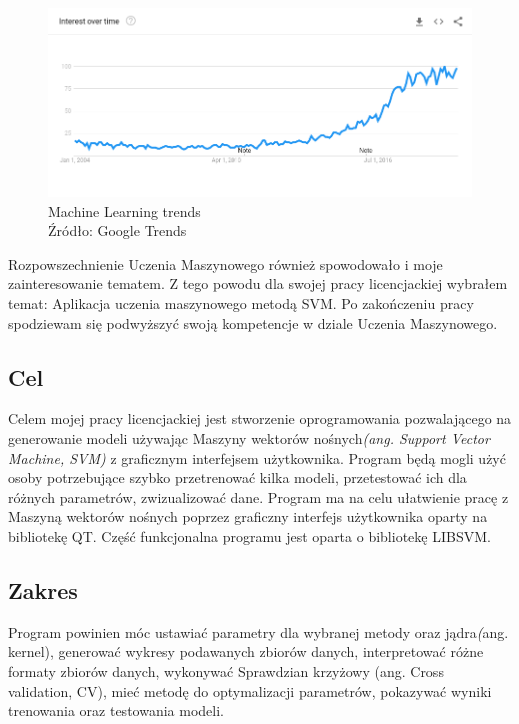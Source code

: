 \documentclass[paper=a4, fontsize=11pt]{scrartcl} %
\numberwithin{equation}{section} %
\numberwithin{figure}{section} %
\newcommand*{\captionsource}[2]{%
  \caption[{#1}]{%
    #1%
    \\\hspace{\linewidth}%
    Źródło: #2%
  }%
}
\begin{document}
\begin{figure}[h]
    \begin{center}
        \includegraphics[scale=0.5]{./img/google-trends-ml.png}
        \captionsource{Machine Learning trends}{Google Trends}
        \label{fig:google-trends-ml}
    \end{center}
\end{figure}

    \par Rozpowszechnienie Uczenia Maszynowego również spowodowało i moje zainteresowanie tematem.
    Z tego powodu dla swojej pracy licencjackiej wybrałem temat: Aplikacja uczenia maszynowego 
    metodą SVM.  Po zakończeniu pracy spodziewam się podwyższyć swoją kompetencje w dziale 
    Uczenia Maszynowego.

\subsection{Cel}
    \par Celem mojej pracy licencjackiej jest stworzenie oprogramowania pozwalającego na generowanie
    modeli używając Maszyny wektorów nośnych\textit{(ang. Support Vector Machine, SVM)} z graficznym 
    interfejsem użytkownika.  Program będą mogli użyć osoby potrzebujące szybko przetrenować kilka 
    modeli, przetestować ich dla różnych parametrów, zwizualizować dane. Program ma na celu ułatwienie
    pracę z Maszyną wektorów nośnych poprzez graficzny interfejs użytkownika
    oparty na bibliotekę QT. Część funkcjonalna programu jest oparta o bibliotekę LIBSVM\cite{CC01a}.

\subsection{Zakres}
    Program powinien móc ustawiać parametry dla wybranej metody oraz jądra\textit(ang. kernel), 
    generować wykresy podawanych zbiorów danych, interpretować różne formaty zbiorów danych, 
    wykonywać Sprawdzian krzyżowy (ang. Cross validation, CV), mieć metodę do optymalizacji 
    parametrów, pokazywać wyniki trenowania oraz testowania modeli.
\newpage
\end{document}
